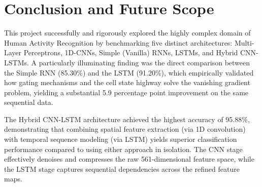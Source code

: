 \documentclass[12pt,a4paper]{article}
\begin{document}
\begin{table}[H]
\centering
\caption{Confusion Matrix for Hybrid CNN-LSTM}
\end{table}

\newpage
\section{Conclusion and Future Scope}
This project successfully and rigorously explored the highly complex domain of Human Activity Recognition by benchmarking five distinct architectures: Multi-Layer Perceptrons, 1D-CNNs, Simple (Vanilla) RNNs, LSTMs, and Hybrid CNN-LSTMs. A particularly illuminating finding was the direct comparison between the Simple RNN (85.30\%) and the LSTM (91.20\%), which empirically validated how gating mechanisms and the cell state highway solve the vanishing gradient problem, yielding a substantial 5.9 percentage point improvement on the same sequential data.

The Hybrid CNN-LSTM architecture achieved the highest accuracy of 95.88\%, demonstrating that combining spatial feature extraction (via 1D convolution) with temporal sequence modeling (via LSTM) yields superior classification performance compared to using either approach in isolation. The CNN stage effectively denoises and compresses the raw 561-dimensional feature space, while the LSTM stage captures sequential dependencies across the refined feature maps.
\end{document}
